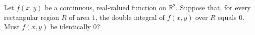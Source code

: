 Let $f(x,y)$ be a continuous, real-valued function on $\mathbb{R}^2$. Suppose that, for every rectangular region $R$ of area $1$, the double integral of $f(x,y)$ over $R$ equals $0$. Must $f(x,y)$ be identically $0$?